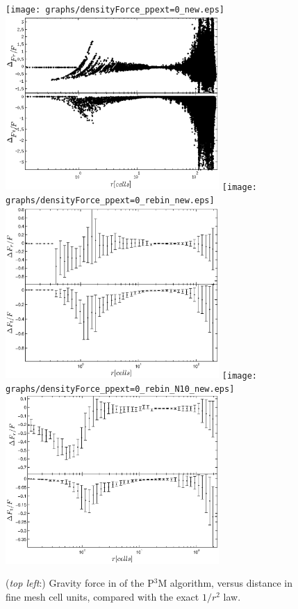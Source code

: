 \begin{figure}%
  \begin{center}
    \texttt{[image: graphs/densityForce\_ppext=0\_new.eps]}
    \includegraphics[width=3.2in]{graphs/densityForce_fracErr_ppext=0_new.eps}
    \texttt{[image: graphs/densityForce\_ppext=0\_rebin\_new.eps]}
    \includegraphics[width=3.2in]{graphs/densityForce_fracErr_ppext=0_rebin_new.eps}
    \texttt{[image: graphs/densityForce\_ppext=0\_rebin\_N10\_new.eps]}
    \includegraphics[width=3.2in]{graphs/densityForce_fracErr_ppext=0_rebin_N10_new.eps}
  \caption{({\it top left}:) Gravity force in of the P$^3$M algorithm, versus distance in fine mesh cell units, compared with the exact $1/r^{2}$ law.
}
\end{center}
\end{figure}
